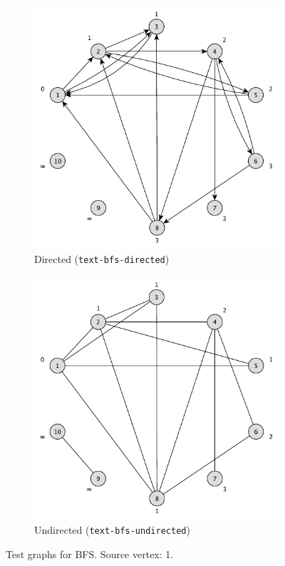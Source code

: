 \begin{figure}[h]
	\centering
	\begin{subfigure}{0.496\textwidth}
		\centering
		\includegraphics[scale=\examplescale]{figures/examples/bfs-dir.pdf}
		\caption{Directed (\texttt{text-bfs-directed})}
	\end{subfigure}
	\begin{subfigure}{0.496\textwidth}
		\centering
		\includegraphics[scale=\examplescale]{figures/examples/bfs-undir.pdf}
		\caption{Undirected (\texttt{text-bfs-undirected})}
	\end{subfigure}
	\caption{Test graphs for BFS. Source vertex: 1.}
	\label{fig:bfs_example}
\end{figure}

